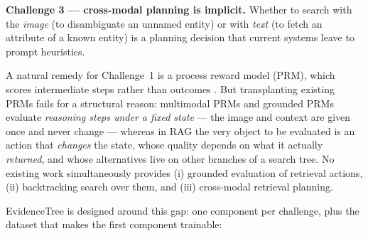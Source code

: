 \documentclass[letterpaper,twocolumn,10pt]{article}
\newcommand{\ours}{EvidenceTree}
\begin{document}
\noindent\textbf{Challenge 3 --- cross-modal planning is implicit.}
Whether to search with the \emph{image} (to disambiguate an unnamed
entity) or with \emph{text} (to fetch an attribute of a known entity) is a
planning decision that current systems leave to prompt heuristics.

A natural remedy for Challenge~1 is a process reward model (PRM), which
scores intermediate steps rather than outcomes
\cite{lightman2023verify,wang2024mathshepherd}. But transplanting existing
PRMs fails for a structural reason: multimodal PRMs \cite{visualprm2025}
and grounded PRMs \cite{groundedprm2025} evaluate \emph{reasoning steps
under a fixed state} --- the image and context are given once and never
change --- whereas in RAG the very object to be evaluated is an action
that \emph{changes} the state, whose quality depends on what it actually
\emph{returned}, and whose alternatives live on other branches of a search
tree. No existing work simultaneously provides (i) grounded evaluation of
retrieval actions, (ii) backtracking search over them, and (iii)
cross-modal retrieval planning.

\ours{} is designed around this gap: one component per challenge, plus
the dataset that makes the first component trainable:
\end{document}

